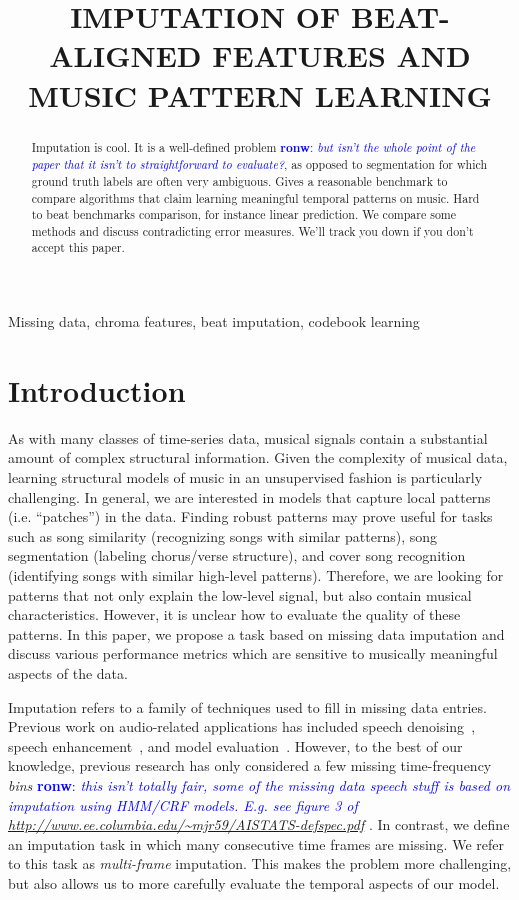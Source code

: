 \documentclass{article}
\title{IMPUTATION OF BEAT-ALIGNED FEATURES AND MUSIC PATTERN LEARNING}
\newcommand{\FIXME}[2][FIXME]{\textcolor{blue}{\textbf{#1}: \emph{#2}}}
\begin{document}
\ninept
%
\maketitle
%
\begin{abstract}
Imputation is cool. It is a well-defined problem
\FIXME[ronw]{but isn't the whole point of the paper
that it isn't to straightforward to evaluate?},
as opposed to segmentation for which ground truth labels are often
very ambiguous.
%
Gives a reasonable benchmark to compare algorithms that claim learning meaningful
temporal patterns on music. Hard to beat benchmarks comparison, for instance linear
prediction. We compare some methods and discuss contradicting error measures. 
We'll track you down if you don't accept this paper.
\end{abstract}
%
\begin{keywords}
Missing data, chroma features, beat imputation, codebook learning
\end{keywords}
%
\section{Introduction}
\label{sec:intro}
As with many classes of time-series data, musical signals contain a
substantial amount of complex structural information.  Given the
complexity of musical data, learning structural models of music in an
unsupervised fashion is particularly challenging.  In general, we are
interested in models that capture local patterns (i.e. ``patches'') in
the data.  Finding robust patterns may prove useful for tasks such as
song similarity (recognizing songs with similar patterns), song
segmentation (labeling chorus/verse structure), and cover song
recognition (identifying songs with similar high-level patterns).
Therefore, we are looking for patterns that not only explain the
low-level signal, but also contain musical characteristics.  However,
it is unclear how to evaluate the quality of these patterns.  In this
paper, we propose a task based on missing data imputation and discuss
various performance metrics which are sensitive to musically
meaningful aspects of the data.

Imputation refers to a family of techniques used to fill in missing
data entries.  Previous work on audio-related applications has
included speech denoising~\cite{Raj1998}, speech
enhancement~\cite{Sanneck1996}, and model
evaluation~\cite{Smaragdis2009,Hoffman2010}.  However, to the best of
our knowledge, previous research has only considered a few missing
time-frequency \emph{bins}
\FIXME[ronw]{this isn't totally fair, some of the missing
  data speech stuff is based on imputation using HMM/CRF models. E.g. see
  figure 3 of
  {\footnotesize \url{http://www.ee.columbia.edu/~mjr59/AISTATS-defspec.pdf}}
}.
In contrast, we define an imputation task
in which  many consecutive time frames are missing.  We refer to
this task as \emph{multi-frame} imputation.  This makes the problem
more challenging, but also allows us to more carefully evaluate the
temporal aspects of our model.  %
\end{document}
